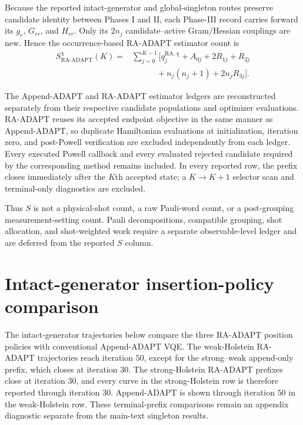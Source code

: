 \documentclass[
  reprint,
  amsmath,
  amssymb,
  aps,
  pra,
  nofootinbib,
  superscriptaddress,
  floatfix
]{revtex4-2}
\begin{document}
Because the reported intact-generator and global-singleton routes preserve
candidate identity between Phases I and II, each Phase-III record carries
forward its \(g_r\), \(G_{rr}\), and \(H_{rr}\). Only its \(2n_j\)
candidate--active Gram/Hessian couplings are new. Hence the occurrence-based
RA-ADAPT estimator count is
\begin{align}
S_{\mathrm{RA\text{-}ADAPT}}^{\chi}(K)
={}&\sum_{j=0}^{K-1}
\Big[
q_j^{\mathrm{RA},\chi}
+A_{0j}+2R_{1j}+R_{2j}
\nonumber\\
&\hspace{3em}
+n_j(n_j+1)+2n_jR_{3j}
\Big].
\label{eq:appendix_s_ra_adapt_reported}
\end{align}

The Append-ADAPT and RA-ADAPT estimator ledgers are reconstructed separately
from their respective candidate populations and optimizer evaluations.
RA-ADAPT reuses its accepted endpoint objective in the same manner as
Append-ADAPT, so duplicate Hamiltonian evaluations at initialization,
iteration zero, and post-Powell verification are excluded independently from
each ledger. Every executed Powell callback and every evaluated rejected
candidate required by the corresponding method remains included. In every
reported row, the prefix closes
immediately after the \(K\)th accepted state; a \(K\!\to\!K+1\) selector scan
and terminal-only diagnostics are excluded.

Thus \(S\) is not a physical-shot count, a raw Pauli-word count, or
a post-grouping measurement-setting count. Pauli decompositions, compatible
grouping, shot allocation, and shot-weighted work require a separate
observable-level ledger and are deferred from the reported \(S\) column.

\clearpage
\onecolumngrid
\section{Intact-generator insertion-policy comparison}
\label{app:fixed_horizon_insertion_costs}

The intact-generator trajectories below compare the three RA-ADAPT position
policies with conventional Append-ADAPT VQE.  The weak-Holstein RA-ADAPT
trajectories reach iteration \(50\), except for the strong--weak append-only
prefix, which closes at iteration \(30\).  The strong-Holstein RA-ADAPT
prefixes close at iteration \(30\), and every curve in the strong-Holstein
row is therefore reported through iteration \(30\). Append-ADAPT is shown
through iteration \(50\) in the weak-Holstein row. These terminal-prefix comparisons remain
an appendix diagnostic separate from the main-text singleton results.
\end{document}
